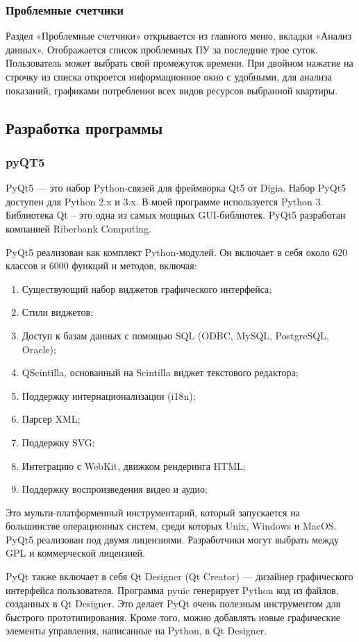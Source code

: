 \subsubsection{Проблемные счетчики}
Раздел «Проблемные счетчики» открывается из главного меню, вкладки «Анализ данных». Отображается список проблемных ПУ за последние трое суток. Пользователь может выбрать свой промежуток времени. При двойном нажатие на строчку из списка откроется информационное окно с удобными, для анализа показаний, графиками потребления всех видов ресурсов выбранной квартиры. 
\subsection{Разработка программы}
\subsubsection{pyQT5}
PyQt5 --- это набор Python-связей для фреймворка Qt5 от Digia. Набор PyQt5 доступен для Python 2.x и 3.x. В моей программе используется Python 3. Библиотека Qt – это одна из самых мощных GUI-библиотек. PyQt5 разработан компанией Riberbank Computing.\cite{Python}

PyQt5 реализован как комплект Python-модулей. Он включает в себя около 620 классов и 6000 функций и методов, включая:
\begin{enumerate}
	\item Существующий набор виджетов графического интерфейса;
	\item Стили виджетов;
	\item Доступ к базам данных с помощью SQL (ODBC, MySQL, PostgreSQL, Oracle);
	\item QScintilla, основанный на Scintilla виджет текстового редактора;
	\item Поддержку интернационализации (i18n);
	\item Парсер XML;
	\item Поддержку SVG;
	\item Интеграцию с WebKit, движком рендеринга HTML;
	\item Поддержку воспроизведения видео и аудио;
\end{enumerate}
Это мульти-платформенный инструментарий, который запускается на большинстве операционных систем, среди которых Unix, Windows и MacOS. PyQt5 реализован под двумя лицензиями. Разработчики могут выбрать между GPL и коммерческой лицензией.

PyQt также включает в себя Qt Designer (Qt Creator) — дизайнер графического интерфейса пользователя. Программа pyuic генерирует Python код из файлов, созданных в Qt Designer. Это делает PyQt очень полезным инструментом для быстрого прототипирования. Кроме того, можно добавлять новые графические элементы управления, написанные на Python, в Qt Designer.\cite{PyQt5}
